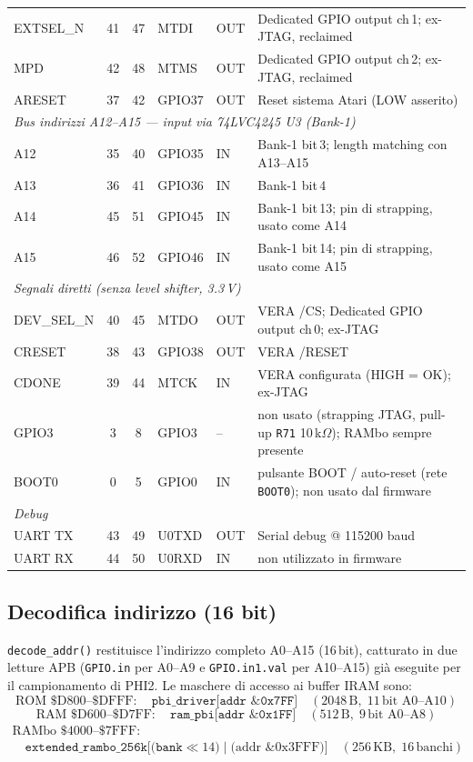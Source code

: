 \documentclass[12pt, a4paper]{article}
\begin{document}
\begin{center}
{\begin{tabular}{lcclll}
EXTSEL\_N & 41 & 47 & MTDI  & OUT & Dedicated GPIO output ch\,1; ex-JTAG, reclaimed \\
MPD       & 42 & 48 & MTMS  & OUT & Dedicated GPIO output ch\,2; ex-JTAG, reclaimed \\
ARESET   & 37 & 42 & GPIO37 & OUT & Reset sistema Atari (LOW asserito) \\
\midrule
\multicolumn{6}{l}{\textit{Bus indirizzi A12--A15 — input via 74LVC4245 U3 (Bank-1)}} \\
A12 & 35 & 40 & GPIO35  & IN & Bank-1 bit\,3; length matching con A13--A15 \\
A13 & 36 & 41 & GPIO36  & IN & Bank-1 bit\,4 \\
A14 & 45 & 51 & GPIO45  & IN & Bank-1 bit\,13; pin di strapping, usato come A14 \\
A15 & 46 & 52 & GPIO46  & IN & Bank-1 bit\,14; pin di strapping, usato come A15 \\
\midrule
\multicolumn{6}{l}{\textit{Segnali diretti (senza level shifter, 3.3\,V)}} \\
DEV\_SEL\_N & 40 & 45 & MTDO  & OUT & VERA /CS; Dedicated GPIO output ch\,0; ex-JTAG \\
CRESET     & 38 & 43 & GPIO38 & OUT & VERA /RESET \\
CDONE      & 39 & 44 & MTCK  & IN  & VERA configurata (HIGH = OK); ex-JTAG \\
GPIO3 & 3 & 8 & GPIO3 & -- & non usato (strapping JTAG, pull-up \texttt{R71} 10\,k$\Omega$); RAMbo sempre presente \\
BOOT0 & 0 & 5 & GPIO0 & IN & pulsante BOOT / auto-reset (rete \texttt{BOOT0}); non usato dal firmware \\
\midrule
\multicolumn{6}{l}{\textit{Debug}} \\
UART TX & 43 & 49 & U0TXD & OUT & Serial debug @ 115200 baud \\
UART RX & 44 & 50 & U0RXD & IN  & non utilizzato in firmware \\
\bottomrule
\end{tabular}%
}
\end{center}

\subsection*{Decodifica indirizzo (16 bit)}

\texttt{decode\_addr()} restituisce l'indirizzo completo A0--A15 (16\,bit), catturato in due letture APB (\texttt{GPIO.in} per A0--A9 e \texttt{GPIO.in1.val} per A10--A15) già eseguite per il campionamento di PHI2. Le maschere di accesso ai buffer IRAM sono:
\[
\text{ROM } \$\text{D800--\$DFFF}: \quad \texttt{pbi\_driver[addr \& 0x7FF]} \quad (2048\,\text{B},\; 11\,\text{bit A0--A10})
\]
\[
\text{RAM } \$\text{D600--\$D7FF}: \quad \texttt{ram\_pbi[addr \& 0x1FF]} \quad (512\,\text{B},\; 9\,\text{bit A0--A8})
\]
\begin{multline*}
\text{RAMbo } \$\text{4000--\$7FFF}: \\
\quad\texttt{extended\_rambo\_256k[(bank} \ll 14) \mid \text{(addr \& 0x3FFF)]}
\quad (256\,\text{KB},\; 16\,\text{banchi})
\end{multline*}
\end{document}
